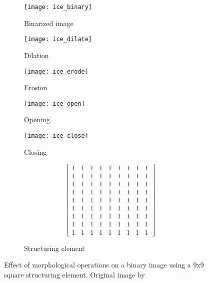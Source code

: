 \renewcommand{\arraystretch}{0.6} %
\begin{figure}[H]
    \centering
    \begin{subfigure}[b]{0.49\textwidth}
        \texttt{[image: ice\_binary]}
        \caption{Binarized image}
        \label{fig:ice_binary}
    \end{subfigure}
    \begin{subfigure}[b]{0.49\textwidth}
        \texttt{[image: ice\_dilate]}
        \caption{Dilation}
        \label{fig:ice_dilation}
    \end{subfigure}
    \begin{subfigure}[b]{0.49\textwidth}
        \texttt{[image: ice\_erode]}
        \caption{Erosion}
        \label{fig:ice_erosion}
    \end{subfigure}
    \begin{subfigure}[b]{0.49\textwidth}
        \texttt{[image: ice\_open]}
        \caption{Opening}
        \label{fig:ice_open}
    \end{subfigure} 
    \begin{subfigure}[b]{0.49\textwidth}
        \texttt{[image: ice\_close]}
        \caption{Closing}
        \label{fig:ice_close}
    \end{subfigure} 
    \begin{subfigure}[b]{0.49\textwidth}
        \[
        \begin{bmatrix}
            1 & 1 & 1 & 1 & 1 & 1 & 1 & 1 & 1 \\
            1 & 1 & 1 & 1 & 1 & 1 & 1 & 1 & 1 \\
            1 & 1 & 1 & 1 & 1 & 1 & 1 & 1 & 1 \\
            1 & 1 & 1 & 1 & 1 & 1 & 1 & 1 & 1 \\
            1 & 1 & 1 & 1 & 1 & 1 & 1 & 1 & 1 \\
            1 & 1 & 1 & 1 & 1 & 1 & 1 & 1 & 1 \\
            1 & 1 & 1 & 1 & 1 & 1 & 1 & 1 & 1 \\
            1 & 1 & 1 & 1 & 1 & 1 & 1 & 1 & 1 \\
            1 & 1 & 1 & 1 & 1 & 1 & 1 & 1 & 1 
        \end{bmatrix}
        \]
        \caption{Structuring element}
        \label{fig:structuring_element}
    \end{subfigure}
    \captionsetup{format = hang}
    \caption{Effect of morphological operations on a binary image using a 9x9 square structuring element. Original image by }
    \label{fig:morphology}
  \end{figure}


